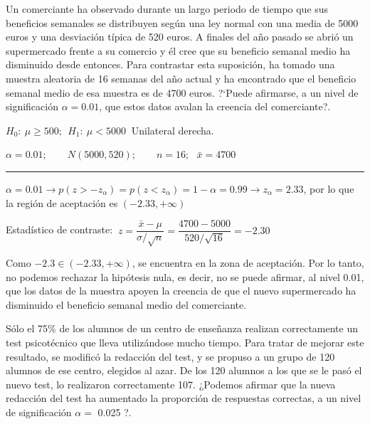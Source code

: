 \vspace{4mm}
\begin{ejemplo}
\begin{ejer}
Un comerciante ha observado durante un largo periodo de tiempo que sus beneficios semanales se distribuyen según una ley normal con una media de 5000 euros y una desviación típica de 520 euros. A finales del año pasado se abrió un supermercado frente a su comercio y él cree que su beneficio semanal medio ha disminuido desde entonces. Para contrastar esta suposición, ha tomado una muestra aleatoria de 16 semanas del año actual y ha encontrado que el beneficio semanal medio de esa muestra es de 4700 euros. ?`Puede afirmarse, a un nivel de significación $\alpha=0.01$, que estos datos avalan la creencia del comerciante?.	
\end{ejer}	
\end{ejemplo}

$H_0:\ \mu\ge 500;\ \ H_1:\ \mu <5000\ $ Unilateral derecha.

$\alpha=0.01;\qquad N(5000,520);\qquad n=16;\ \ \ \bar x=4700$

\rule{150pt}{0.1pt}

$\alpha=0.01 \to p(z>-z_\alpha)=p(z<z_\alpha)=1-\alpha=0.99 \to z_\alpha=2.33$, por lo que la región de aceptación es $(-2.33,+\infty)$ 

Estadístico de contraste: $\ z=\dfrac{\bar x - \mu}{\sigma/\sqrt{n}}=\dfrac{4700-5000}{520/\sqrt{16}}=-2.30$


Como $-2.3 \in (-2.33,+\infty)$, se encuentra en la zona de aceptación. Por lo tanto, no podemos rechazar la hipótesis nula, es decir, no se puede afirmar, al nivel 0.01, que los datos de la muestra apoyen la creencia de que el nuevo supermercado ha disminuido el beneficio semanal medio del comerciante.

\vspace{4mm}
\begin{ejemplo}
\begin{ejer}
	Sólo el 75\% de los alumnos de un centro de enseñanza realizan correctamente un test psicotécnico que lleva utilizándose mucho tiempo. Para tratar de mejorar este resultado, se modificó la redacción del test, y se propuso a un grupo de 120 alumnos de ese centro, elegidos al azar. De los 120 alumnos a los que se le pasó el nuevo test, lo realizaron correctamente 107. ¿Podemos afirmar que la nueva redacción del test ha aumentado la proporción de respuestas correctas, a un nivel de significación $\alpha =$ 0.025 ?.
\end{ejer}
\end{ejemplo}

